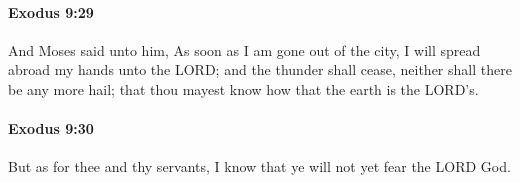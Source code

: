 		\paragraph{Exodus 9:29} %
			\label{EXODUS-9-29}

			And Moses said unto him, As soon as I am gone out of the city, I will spread abroad my hands unto the LORD; and the thunder shall cease, neither shall there be any more hail; that thou mayest know how that the earth is the LORD's.


		\paragraph{Exodus 9:30} %
			\label{EXODUS-9-30}

			But as for thee and thy servants, I know that ye will not yet fear the LORD God.


